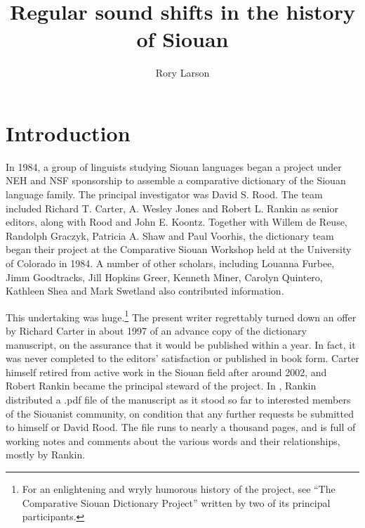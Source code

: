 \documentclass[output=paper]{LSP/langsci}
\author{Rory Larson}
\title{Regular sound shifts in the history of Siouan}
\begin{document}
\section{Introduction}  
In 1984, a group of linguists studying Siouan languages began a  project under NEH and NSF sponsorship to assemble a comparative dictionary of the Siouan language family.  The principal investigator was David S. Rood. The team included Richard T. Carter, A. Wesley Jones and Robert L. Rankin as senior editors, along with Rood and John E. Koontz.  Together with Willem de Reuse, Randolph Graczyk, Patricia A. Shaw and Paul Voorhis, the dictionary team began their project at the Comparative Siouan Workshop held at the University of Colorado in 1984.  A number of other scholars, including Louanna Furbee, Jimm Goodtracks, Jill Hopkins Greer, Kenneth Miner, Carolyn Quintero, Kathleen Shea and Mark Swetland also contributed information.

This undertaking was huge.\footnote{For an enlightening and wryly humorous history of the project, see ``The Comparative Siouan Dictionary Project'' \citep{RoodKoontz2002} written by two of its principal participants.} The present writer regrettably turned down an offer by Richard Carter in about 1997 of an advance copy of the dictionary manuscript, on the assurance that it would be published within a year.  In fact, it was never completed to the editors' satisfaction or published in book form. Carter himself retired from active work in the Siouan field after around 2002, and Robert Rankin became the principal steward of the project.  In \citeyear{Rankinetal2006PDF}, Rankin distributed a .pdf file of the manuscript as it stood so far to interested members of the Siouanist community, on condition that any further requests be submitted to himself or David Rood.  The file runs to nearly a thousand pages, and is full of working notes and comments about the various words and their relationships, mostly by Rankin.
\end{document}
